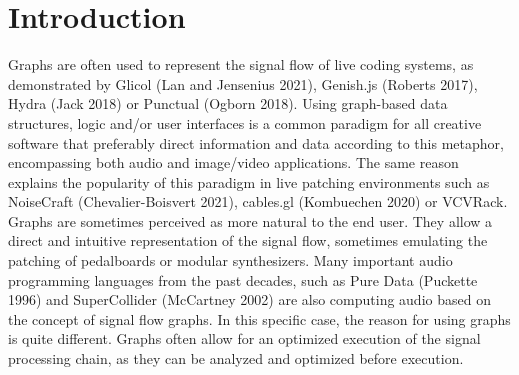 \documentclass[11pt,]{article}
\begin{document}
\section{Introduction}\label{introduction}

Graphs are often used to represent the signal flow of live coding
systems, as demonstrated by Glicol (Lan and Jensenius 2021), Genish.js
(Roberts 2017), Hydra (Jack 2018) or Punctual (Ogborn 2018). Using
graph-based data structures, logic and/or user interfaces is a common
paradigm for all creative software that preferably direct information
and data according to this metaphor, encompassing both audio and
image/video applications. The same reason explains the popularity of
this paradigm in live patching environments such as NoiseCraft
(Chevalier-Boisvert 2021), cables.gl (Kombuechen 2020) or VCVRack.
Graphs are sometimes perceived as more natural to the end user. They
allow a direct and intuitive representation of the signal flow,
sometimes emulating the patching of pedalboards or modular synthesizers.
Many important audio programming languages from the past decades, such
as Pure Data (Puckette 1996) and SuperCollider (McCartney 2002) are also
computing audio based on the concept of signal flow graphs. In this
specific case, the reason for using graphs is quite different. Graphs
often allow for an optimized execution of the signal processing chain,
as they can be analyzed and optimized before execution.
\end{document}
